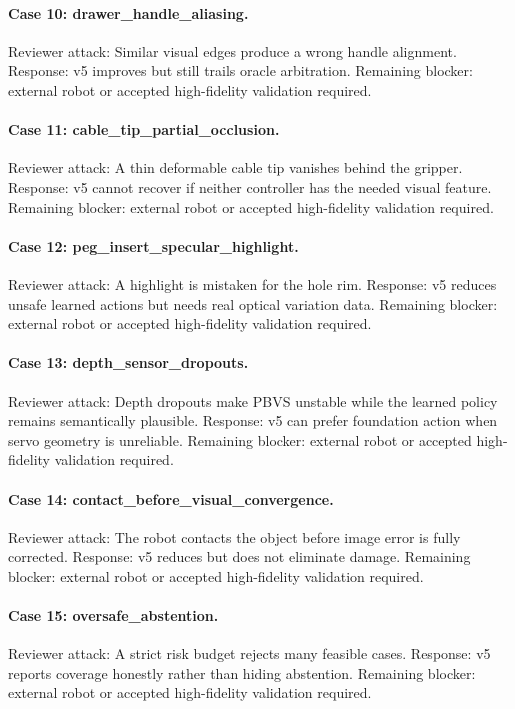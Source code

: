\documentclass{article}
\begin{document}
\paragraph{Case 10: drawer\_handle\_aliasing.} Reviewer attack: Similar visual edges produce a wrong handle alignment. Response: v5 improves but still trails oracle arbitration. Remaining blocker: external robot or accepted high-fidelity validation required.
\paragraph{Case 11: cable\_tip\_partial\_occlusion.} Reviewer attack: A thin deformable cable tip vanishes behind the gripper. Response: v5 cannot recover if neither controller has the needed visual feature. Remaining blocker: external robot or accepted high-fidelity validation required.
\paragraph{Case 12: peg\_insert\_specular\_highlight.} Reviewer attack: A highlight is mistaken for the hole rim. Response: v5 reduces unsafe learned actions but needs real optical variation data. Remaining blocker: external robot or accepted high-fidelity validation required.
\paragraph{Case 13: depth\_sensor\_dropouts.} Reviewer attack: Depth dropouts make PBVS unstable while the learned policy remains semantically plausible. Response: v5 can prefer foundation action when servo geometry is unreliable. Remaining blocker: external robot or accepted high-fidelity validation required.
\paragraph{Case 14: contact\_before\_visual\_convergence.} Reviewer attack: The robot contacts the object before image error is fully corrected. Response: v5 reduces but does not eliminate damage. Remaining blocker: external robot or accepted high-fidelity validation required.
\paragraph{Case 15: oversafe\_abstention.} Reviewer attack: A strict risk budget rejects many feasible cases. Response: v5 reports coverage honestly rather than hiding abstention. Remaining blocker: external robot or accepted high-fidelity validation required.
\end{document}
